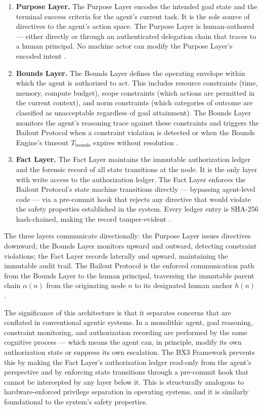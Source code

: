 \begin{enumerate}
    \item \textbf{Purpose Layer.} The Purpose Layer encodes the intended goal state and the terminal success criteria for the agent's current task. It is the sole source of directives to the agent's action space. The Purpose Layer is human-authored --- either directly or through an authenticated delegation chain that traces to a human principal. No machine actor can modify the Purpose Layer's encoded intent \cite{bx3framework2026}.
    \item \textbf{Bounds Layer.} The Bounds Layer defines the operating envelope within which the agent is authorized to act. This includes resource constraints (time, memory, compute budget), scope constraints (which actions are permitted in the current context), and norm constraints (which categories of outcome are classified as unacceptable regardless of goal attainment). The Bounds Layer monitors the agent's reasoning trace against these constraints and triggers the Bailout Protocol when a constraint violation is detected or when the Bounds Engine's timeout $T_{\text{bounds}}$ expires without resolution \cite{bx3framework2026}.
    \item \textbf{Fact Layer.} The Fact Layer maintains the immutable authorization ledger and the forensic record of all state transitions at the node. It is the only layer with write access to the authorization ledger. The Fact Layer enforces the Bailout Protocol's state machine transitions directly --- bypassing agent-level code --- via a pre-commit hook that rejects any directive that would violate the safety properties established in the system. Every ledger entry is SHA-256 hash-chained, making the record tamper-evident \cite{bx3framework2026}.
\end{enumerate}

The three layers communicate directionally: the Purpose Layer issues directives downward; the Bounds Layer monitors upward and outward, detecting constraint violations; the Fact Layer records laterally and upward, maintaining the immutable audit trail. The Bailout Protocol is the enforced communication path from the Bounds Layer to the human principal, traversing the immutable parent chain $\alpha(n)$ from the originating node $n$ to its designated human anchor $h(n)$ \cite{bailoutprotocol2026}.

The significance of this architecture is that it separates concerns that are conflated in conventional agentic systems. In a monolithic agent, goal reasoning, constraint monitoring, and authorization recording are performed by the same cognitive process --- which means the agent can, in principle, modify its own authorization state or suppress its own escalation. The BX3 Framework prevents this by making the Fact Layer's authorization ledger read-only from the agent's perspective and by enforcing state transitions through a pre-commit hook that cannot be intercepted by any layer below it. This is structurally analogous to hardware-enforced privilege separation in operating systems, and it is similarly foundational to the system's safety properties.

